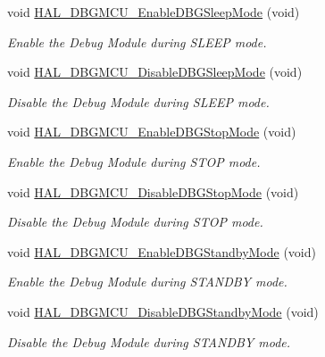 \begin{DoxyCompactItemize}
void \mbox{\hyperlink{group___h_a_l___exported___functions___group2_gaf031bcc71ebad9b7edf405547efd762b}{H\+A\+L\+\_\+\+D\+B\+G\+M\+C\+U\+\_\+\+Enable\+D\+B\+G\+Sleep\+Mode}} (void)
\begin{DoxyCompactList}\small\item\em Enable the Debug Module during S\+L\+E\+EP mode. \end{DoxyCompactList}\item 
void \mbox{\hyperlink{group___h_a_l___exported___functions___group2_gac7820d0561f19999a68d714655b901b5}{H\+A\+L\+\_\+\+D\+B\+G\+M\+C\+U\+\_\+\+Disable\+D\+B\+G\+Sleep\+Mode}} (void)
\begin{DoxyCompactList}\small\item\em Disable the Debug Module during S\+L\+E\+EP mode. \end{DoxyCompactList}\item 
void \mbox{\hyperlink{group___h_a_l___exported___functions___group2_gadf25043b17de4bef38a95a75fd03e5c4}{H\+A\+L\+\_\+\+D\+B\+G\+M\+C\+U\+\_\+\+Enable\+D\+B\+G\+Stop\+Mode}} (void)
\begin{DoxyCompactList}\small\item\em Enable the Debug Module during S\+T\+OP mode. \end{DoxyCompactList}\item 
void \mbox{\hyperlink{group___h_a_l___exported___functions___group2_ga2c93dcee35e5983d74f1000de7c042d5}{H\+A\+L\+\_\+\+D\+B\+G\+M\+C\+U\+\_\+\+Disable\+D\+B\+G\+Stop\+Mode}} (void)
\begin{DoxyCompactList}\small\item\em Disable the Debug Module during S\+T\+OP mode. \end{DoxyCompactList}\item 
void \mbox{\hyperlink{group___h_a_l___exported___functions___group2_ga28a1323b2eeb0a408c1cfdbfa0db5ead}{H\+A\+L\+\_\+\+D\+B\+G\+M\+C\+U\+\_\+\+Enable\+D\+B\+G\+Standby\+Mode}} (void)
\begin{DoxyCompactList}\small\item\em Enable the Debug Module during S\+T\+A\+N\+D\+BY mode. \end{DoxyCompactList}\item 
void \mbox{\hyperlink{group___h_a_l___exported___functions___group2_ga7faa58d8508ea3123b9f247a70379779}{H\+A\+L\+\_\+\+D\+B\+G\+M\+C\+U\+\_\+\+Disable\+D\+B\+G\+Standby\+Mode}} (void)
\begin{DoxyCompactList}\small\item\em Disable the Debug Module during S\+T\+A\+N\+D\+BY mode. \end{DoxyCompactList}\item 

\end{DoxyCompactItemize}
